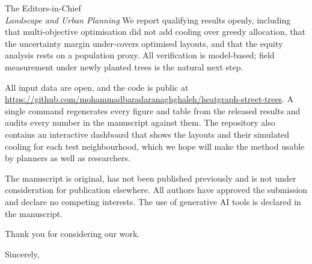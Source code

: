 \documentclass[11pt]{letter}
\begin{document}
\begin{letter}{The Editors-in-Chief\\\emph{Landscape and Urban Planning}}
We report qualifying results openly, including that multi-objective optimisation did not add cooling over greedy allocation, that the uncertainty margin under-covers optimised layouts, and that the equity analysis rests on a population proxy. All verification is model-based; field measurement under newly planted trees is the natural next step.

All input data are open, and the code is public at \url{https://github.com/mohammadbaradaranaghghaleh/heatgraph-street-trees}. A single command regenerates every figure and table from the released results and audits every number in the manuscript against them. The repository also contains an interactive dashboard that shows the layouts and their simulated cooling for each test neighbourhood, which we hope will make the method usable by planners as well as researchers.

The manuscript is original, has not been published previously and is not under consideration for publication elsewhere. All authors have approved the submission and declare no competing interests. The use of generative AI tools is declared in the manuscript.

Thank you for considering our work.

\closing{Sincerely,}

\end{letter}
\end{document}
